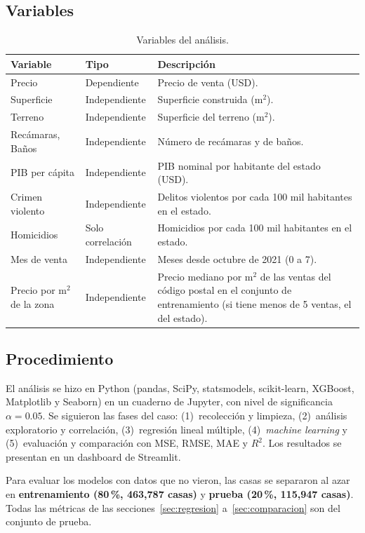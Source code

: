 \documentclass[12pt,letterpaper]{article}
\begin{document}
\subsection{Variables}

\begin{table}[H]
\centering
\caption{Variables del análisis.}
\small
\begin{tabular}{llp{8.3cm}}
\toprule
Variable & Tipo & Descripción \\
\midrule
Precio & Dependiente & Precio de venta (USD). \\
Superficie & Independiente & Superficie construida (m$^2$). \\
Terreno & Independiente & Superficie del terreno (m$^2$). \\
Recámaras, Baños & Independiente & Número de recámaras y de baños. \\
PIB per cápita & Independiente & PIB nominal por habitante del estado (USD). \\
Crimen violento & Independiente & Delitos violentos por cada 100 mil habitantes en el estado. \\
Homicidios & Solo correlación & Homicidios por cada 100 mil habitantes en el estado. \\
Mes de venta & Independiente & Meses desde octubre de 2021 (0 a 7). \\
Precio por m$^2$ de la zona & Independiente & Precio mediano por m$^2$ de las ventas del código postal en el conjunto de entrenamiento (si tiene menos de 5 ventas, el del estado). \\
\bottomrule
\end{tabular}
\end{table}

\subsection{Procedimiento}

El análisis se hizo en Python (pandas, SciPy, statsmodels, scikit-learn, XGBoost, Matplotlib y Seaborn) en un cuaderno de Jupyter, con nivel de significancia $\alpha = 0.05$. Se siguieron las fases del caso: (1)~recolección y limpieza, (2)~análisis exploratorio y correlación, (3)~regresión lineal múltiple, (4)~\emph{machine learning} y (5)~evaluación y comparación con MSE, RMSE, MAE y $R^2$. Los resultados se presentan en un dashboard de Streamlit.

Para evaluar los modelos con datos que no vieron, las casas se separaron al azar en \textbf{entrenamiento (80\,\%, 463,787 casas)} y \textbf{prueba (20\,\%, 115,947 casas)}. Todas las métricas de las secciones~\ref{sec:regresion} a~\ref{sec:comparacion} son del conjunto de prueba.
\end{document}
